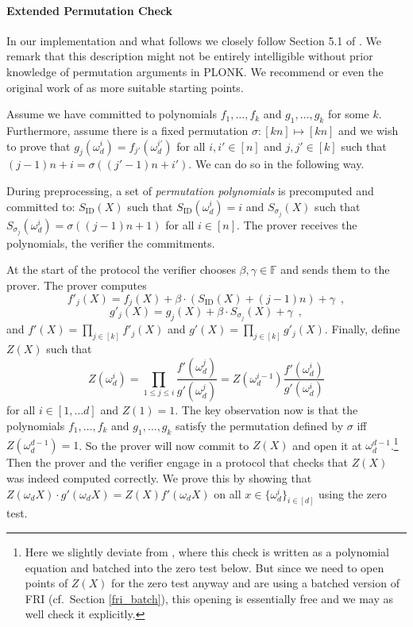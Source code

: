 \documentclass[final]{zamarep}
\newcommand{\field}{\mathbb{F}}
\newcommand{\Sel}[1]{S_{\mathrm{#1}}}
\begin{document}
\paragraph{Extended Permutation Check}
In our implementation and what follows we closely follow Section 5.1 of \cite{EPRINT:GabWilCio19}. We remark that this description might not be entirely intelligible without prior knowledge of permutation arguments in PLONK. We recommend \cite{zkp_mooc,zk_sessions} or even the original work of \cite{EPRINT:GabWilCio19} as more suitable starting points.

Assume we have committed to polynomials $f_1, \dots, f_k$ and $g_1, \dots, g_k$ for some $k$. Furthermore, assume there is a fixed permutation $\sigma: [kn] \mapsto [kn]$ and we wish to prove that $g_j(\omega_d^i) = f_{j'}(\omega_d^{i'})$ for all $i, i' \in [n]$ and $j, j' \in [k]$ such that $(j-1) n + i = \sigma((j' - 1) n + i')$. We can do so in the following way.

During preprocessing, a set of \emph{permutation polynomials} is precomputed and committed to: $\Sel{ID}(X)$ such that $\Sel{ID}(\omega_d^i) = i$ and $S_{\sigma_j}(X)$ such that $S_{\sigma_j}(\omega_d^i) = \sigma((j - 1) n + 1)$ for all $i \in [n]$. The prover receives the polynomials, the verifier the commitments.

At the start of the protocol the verifier chooses $\beta, \gamma \in \field$ and sends them to the prover. The prover computes
\[
  f'_j(X) = f_j(X) + \beta \cdot (\Sel{ID}(X) + (j - 1)n) + \gamma\enspace,
\]
\[
  g'_j(X) = g_j(X) + \beta \cdot S_{\sigma_j}(X) + \gamma\enspace,
\]
and $f'(X) = \prod_{j \in [k]} f'_j(X)$ and $g'(X) = \prod_{j \in [k]} g'_j(X)$. 
Finally, define $Z(X)$ such that
\[
  Z(\omega_d^i) = \prod_{1 \leq j \leq i} \frac{f'(\omega_d^j)}{g'(\omega_d^j)} = Z(\omega_d^{i-1}) \frac{f'(\omega_d^i)}{g'(\omega_d^i)}
\]
for all $i \in [1, \dots d]$ and $Z(1) = 1$. The key observation now is that the polynomials $f_1, \dots, f_k$ and $g_1, \dots, g_k$ satisfy the permutation defined by $\sigma$ iff $Z(\omega_d^{d-1}) = 1$. So the prover will now commit to $Z(X)$ and open it at $\omega_d^{d-1}$.\footnote{Here we slightly deviate from \cite{EPRINT:GabWilCio19}, where this check is written as a polynomial equation and batched into the zero test below. But since we need to open points of $Z(X)$ for the zero test anyway and are using a batched version of FRI (cf.\ Section \ref{fri_batch}), this opening is essentially free and we may as well check it explicitly.} Then the prover and the verifier engage in a protocol that checks that $Z(X)$ was indeed computed correctly. We prove this by showing that $Z(\omega_d X)\cdot g'(\omega_d X) = Z(X) f'(\omega_d X)$ on all $x \in \{\omega_d^i\}_{i \in [d]}$ using the zero test.
\end{document}
